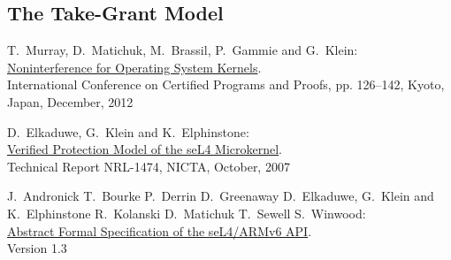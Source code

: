 \documentclass[pdftex,12pt,a4paper]{article}
\begin{document}
	\newpage
	\subsection{The Take-Grant Model}	
	
	
	\cleardoublepage
	\begin{thebibliography}{99}

	T.\ Murray, D.\ Matichuk, M.\ Brassil, P.\ Gammie and G.\ Klein:	\\ 
	\href{http://www.ssrg.nicta.com/publications/nicta_full_text/6004.pdf}{%
		Noninterference for Operating System Kernels}. \\
    International Conference on Certified Programs and Proofs, pp. 126–142, Kyoto, Japan, December, 2012

	D.\ Elkaduwe, G.\ Klein and K.\ Elphinstone:	\\ 
	\href{http://ts.data61.csiro.au/publications/nicta_full_text/1474.pdf}{%
		Verified Protection Model of the seL4 Microkernel}. \\
   	Technical Report NRL-1474, NICTA, October, 2007
   	
	J.\ Andronick T.\ Bourke P.\ Derrin D.\ Greenaway D.\ Elkaduwe, G.\ Klein and K.\ Elphinstone R.\ Kolanski D.\ Matichuk T.\ Sewell S.\ Winwood:	\\ 
	\href{https://sel4.systems/Info/Docs/seL4-spec.pdf}{%
		Abstract Formal Specification of the seL4/ARMv6 API}. \\
   	Version 1.3

\end{thebibliography}
	
\end{document}
